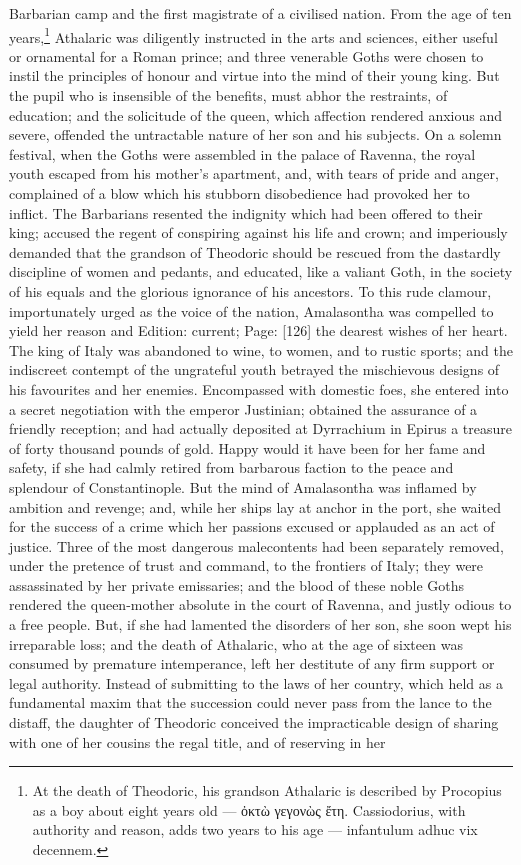 Barbarian camp and the first magistrate of a civilised nation. From the age of ten years,\footnote{At the death of Theodoric, his grandson Athalaric is described by Procopius as a boy about eight years old \texthebrew{—} \textgreek{\texthebrew{ὀ}κτ\texthebrew{ὼ} γεγον\texthebrew{ὼ}ς \texthebrew{ἔ}τη}. Cassiodorius, with authority and reason, adds two years to his age \texthebrew{—} infantulum adhuc vix decennem.} Athalaric was diligently instructed in the arts and sciences, either useful or ornamental for a Roman prince; and three venerable Goths were chosen to instil the principles of honour and virtue into the mind of their young king. But the pupil who is insensible of the benefits, must abhor the restraints, of education; and the solicitude of the queen, which affection rendered anxious and severe, offended the untractable nature of her son and his subjects. On a solemn festival, when the Goths were assembled in the palace of Ravenna, the royal youth escaped from his mother\texthebrew{}’s apartment, and, with tears of pride and anger, complained of a blow which his stubborn disobedience had provoked her to inflict. The Barbarians resented the indignity which had been offered to their king; accused the regent of conspiring against his life and crown; and imperiously demanded that the grandson of Theodoric should be rescued from the dastardly discipline of women and pedants, and educated, like a valiant Goth, in the society of his equals and the glorious ignorance of his ancestors. To this rude clamour, importunately urged as the voice of the nation, Amalasontha was compelled to yield her reason and Edition: current; Page: [126] the dearest wishes of her heart. The king of Italy was abandoned to wine, to women, and to rustic sports; and the indiscreet contempt of the ungrateful youth betrayed the mischievous designs of his favourites and her enemies. Encompassed with domestic foes, she entered into a secret negotiation with the emperor Justinian; obtained the assurance of a friendly reception; and had actually deposited at Dyrrachium in Epirus a treasure of forty thousand pounds of gold. Happy would it have been for her fame and safety, if she had calmly retired from barbarous faction to the peace and splendour of Constantinople. But the mind of Amalasontha was inflamed by ambition and revenge; and, while her ships lay at anchor in the port, she waited for the success of a crime which her passions excused or applauded as an act of justice. Three of the most dangerous malecontents had been separately removed, under the pretence of trust and command, to the frontiers of Italy; they were assassinated by her private emissaries; and the blood of these noble Goths rendered the queen-mother absolute in the court of Ravenna, and justly odious to a free people. But, if she had lamented the disorders of her son, she soon wept his irreparable loss; and the death of Athalaric, who at the age of sixteen was consumed by premature intemperance, left her destitute of any firm support or legal authority. Instead of submitting to the laws of her country, which held as a fundamental maxim that the succession could never pass from the lance to the distaff, the daughter of Theodoric conceived the impracticable design of sharing with one of her cousins the regal title, and of reserving in her 